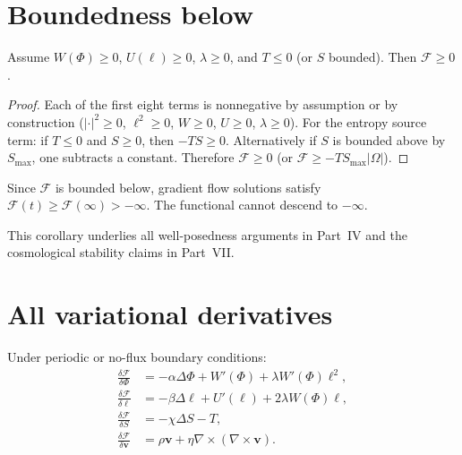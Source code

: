 \section{Boundedness below}

\begin{theorem}
  \label{thm:bounded-below}
  \statusproven{}
  Assume $W(\Phi) \geq 0$, $U(\ell) \geq 0$, $\lambda \geq 0$,
  and $T \leq 0$ (or $S$ bounded).
  Then $\mathcal{F} \geq 0$.
\end{theorem}

\begin{proof}
  Each of the first eight terms is nonnegative by assumption
  or by construction ($|\cdot|^2 \geq 0$, $\ell^2 \geq 0$,
  $W \geq 0$, $U \geq 0$, $\lambda \geq 0$).
  For the entropy source term: if $T \leq 0$ and $S \geq 0$,
  then $-TS \geq 0$.
  Alternatively if $S$ is bounded above by $S_{\max}$,
  one subtracts a constant.
  Therefore $\mathcal{F} \geq 0$ (or $\mathcal{F} \geq -TS_{\max}|\Omega|$).
\end{proof}

\begin{corollary}
  Since $\mathcal{F}$ is bounded below, gradient flow solutions
  satisfy $\mathcal{F}(t) \geq \mathcal{F}(\infty) > -\infty$.
  The functional cannot descend to $-\infty$.
\end{corollary}

This corollary underlies all well-posedness arguments in
Part~IV and the cosmological stability claims in Part~VII.

\section{All variational derivatives}

\begin{theorem}
  \label{thm:all-variations}
  \statusproven{}
  Under periodic or no-flux boundary conditions:
  \begin{align}
    \frac{\delta\mathcal{F}}{\delta\Phi}
    &= -\alpha\Delta\Phi + W'(\Phi) + \lambda W'(\Phi)\ell^2,
    \label{eq:var-Phi}\\
    \frac{\delta\mathcal{F}}{\delta\ell}
    &= -\beta\Delta\ell + U'(\ell) + 2\lambda W(\Phi)\ell,
    \label{eq:var-ell}\\
    \frac{\delta\mathcal{F}}{\delta S}
    &= -\chi\Delta S - T,
    \label{eq:var-S}\\
    \frac{\delta\mathcal{F}}{\delta\mathbf{v}}
    &= \rho\mathbf{v} + \eta\nabla\times(\nabla\times\mathbf{v}).
    \label{eq:var-v}
  \end{align}
\end{theorem}


